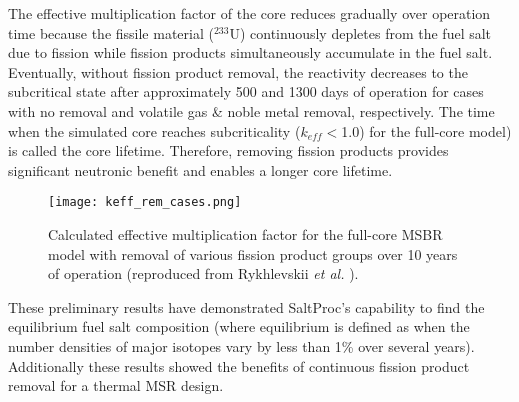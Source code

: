 The effective multiplication factor of the core reduces gradually over 
operation time because the fissile material ($^{233}$U) continuously depletes 
from the fuel salt due to fission while fission products simultaneously
accumulate in the fuel salt. Eventually, without fission product removal, 
the reactivity decreases to the subcritical state after approximately 500 and 
1300 days of operation for cases with no removal and volatile gas \& noble 
metal removal, respectively. The time when the simulated core reaches 
subcriticality ($k_{eff}<$1.0) for the full-core model) is called the core 
lifetime. Therefore, removing fission products provides significant neutronic 
benefit and enables a longer core lifetime.
\begin{figure}[t] %
	\centering
	\texttt{[image: keff\_rem\_cases.png]} 
	\caption{Calculated effective multiplication factor for the full-core 
	\gls{MSBR} model with removal of various fission product groups over 10 
	years of operation (reproduced from Rykhlevskii \emph{et al.} 
	\cite{rykhlevskii_modeling_2019}).}
	\label{fig:fp_removal}
\end{figure}

These preliminary results have demonstrated SaltProc's capability to find 
the equilibrium fuel salt composition (where equilibrium is defined as when 
the number densities of major isotopes vary by less than 1\% over several 
years). Additionally these results showed the benefits of continuous fission 
product removal for a thermal \gls{MSR} design.
